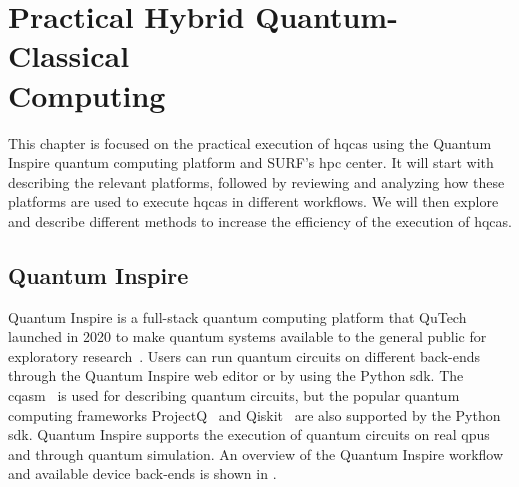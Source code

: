 \chapter[Practical Hybrid Quantum-Classical Computing]{Practical Hybrid Quantum-Classical\\Computing} \label{chap:practical-hybrid-quantum-classical-computing}
This chapter is focused on the practical execution of \glspl{hqca} using the Quantum Inspire quantum computing platform and SURF's \gls{hpc} center.
It will start with describing the relevant platforms, followed by reviewing and analyzing how these platforms are used to execute \glspl{hqca} in different workflows.
We will then explore and describe different methods to increase the efficiency of the execution of \glspl{hqca}.

\section{Quantum Inspire}
Quantum Inspire is a full-stack quantum computing platform that QuTech launched in 2020 to make quantum systems available to the general public for exploratory research~\cite{last2020quantum}.
Users can run quantum circuits on different back-ends through the Quantum Inspire web editor or by using the Python \gls{sdk}.
The \gls{cqasm}~\cite{khammassi2018cqasm} is used for describing quantum circuits, but the popular quantum computing frameworks ProjectQ~\cite{steiger2018projectq} and Qiskit~\cite{qiskit} are also supported by the Python \gls{sdk}.
Quantum Inspire supports the execution of quantum circuits on real \glspl{qpu} and through quantum simulation.
An overview of the Quantum Inspire workflow and available device back-ends is shown in .

